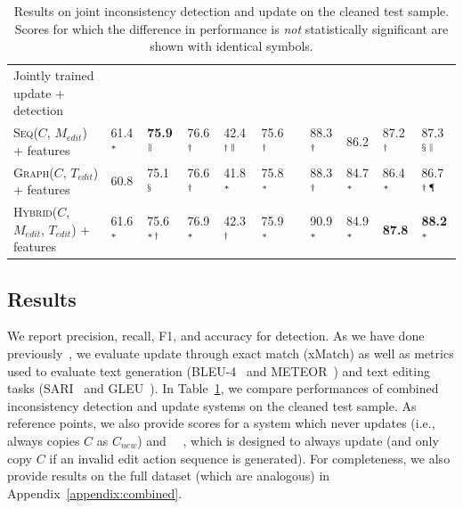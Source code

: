 \documentclass[letterpaper]{article} %
\makeatletter
\newcommand{\Comment}{$C$}
\newcommand{\NewComment}{$C_{new}$}
\newcommand{\EditCode}{$M_{edit}$}
\newcommand{\EditTree}{$T_{edit}$}
\newcommand{\SeqModel}{\textsc{Seq}}
\newcommand{\GraphModel}{\textsc{Graph}}
\newcommand{\HybridModel}{\textsc{Hybrid}}
\newcommand{\JustInTimeSeq}{\SeqModel{}(\Comment{}, \EditCode{})}
\newcommand{\JustInTimeGraph}{\GraphModel{}(\Comment{}, \EditTree{})}
\newcommand{\JustInTimeHybrid}{\HybridModel{}(\Comment{}, \EditCode{}, \EditTree{})}
\newcommand{\JointlyTrained}{Jointly trained update + detection}
\def\@fnsymbol#1{\ensuremath{\ifcase#1\or *\or \dagger\or \ddagger\or
\mathsection\or \mathparagraph\or \|\or **\or \dagger\dagger
\or \ddagger\ddagger \else\@ctrerr\fi}}
\newcommand{\ssymbol}[1]{^{\@fnsymbol{#1}}}
\makeatother
\begin{document}
\begin{table}
\begin{tabular}{l@{\hskip 3mm}llllll@{\hskip 1mm}llll}
\JointlyTrained{} &  &  &  &  &  & &  &  &   &  \\
\hspace{0.2cm}\JustInTimeSeq{} + features &  61.4$\ssymbol{1}$ & \bf 75.9$\ssymbol{6}$ & 76.6$\ssymbol{2}$ & 42.4$\ssymbol{2}$$\ssymbol{6}$ & 75.6$\ssymbol{2}$ && 88.3$\ssymbol{2}$ & 86.2 & 87.2$\ssymbol{2}$ & 87.3$\ssymbol{4}$$\ssymbol{6}$ \\
\hspace{0.2cm}\JustInTimeGraph{} + features &  60.8 & 75.1$\ssymbol{4}$ & 76.6$\ssymbol{2}$  & 41.8$\ssymbol{1}$ & 75.8$\ssymbol{1}$ && 88.3$\ssymbol{2}$ & 84.7$\ssymbol{1}$ & 86.4$\ssymbol{1}$ & 86.7$\ssymbol{2}$$\ssymbol{5}$ \\
\hspace{0.2cm}\JustInTimeHybrid{} + features & 61.6$\ssymbol{1}$ & 75.6$\ssymbol{1}$$\ssymbol{2}$ & 76.9$\ssymbol{1}$ & 42.3$\ssymbol{2}$ & 75.9$\ssymbol{1}$ && 90.9$\ssymbol{1}$ & 84.9$\ssymbol{1}$ & \bf 87.8 & \bf 88.2$\ssymbol{1}$ \\
\hline
\end{tabular}
\caption{\label{table:comment-update-table}Results on joint inconsistency detection and update on the cleaned test sample. Scores for which the difference in performance is \textit{not} statistically significant are shown with identical symbols.}
\end{table}



\subsection{Results}
\label{sec:extrinsic-results}
We report precision, recall, F1, and accuracy for detection. As we have done previously~\cite{panthaplackel2020update}, we evaluate update through exact match (xMatch) as well as metrics used to evaluate text generation (BLEU-4~\cite{papineni2002bleu} and METEOR~\cite{BanerjeeEtAL2005}) and text editing tasks (SARI~\cite{xu-etal-2016-optimizing} and GLEU~\cite{napoles-etal-2015-ground}). In Table~\ref{table:comment-update-table}, we compare performances of combined inconsistency detection and update systems on the cleaned test sample. As reference points, we also provide scores for a system which never updates (i.e., always copies \Comment{} as \NewComment{}) and  ~\citeauthor{panthaplackel2020update}~, which is designed to always update (and only copy \Comment{} if an invalid edit action sequence is generated).
For completeness, we also provide results on the full dataset (which are analogous) in Appendix~\ref{appendix:combined}.
\end{document}

